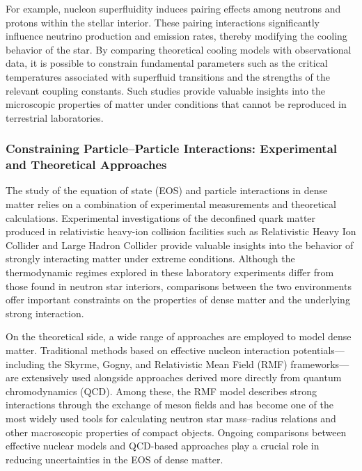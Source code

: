 For example, nucleon superfluidity induces pairing effects among neutrons and protons within the stellar interior. These pairing interactions significantly influence neutrino production and emission rates, thereby modifying the cooling behavior of the star. By comparing theoretical cooling models with observational data, it is possible to constrain fundamental parameters such as the critical temperatures associated with superfluid transitions and the strengths of the relevant coupling constants. Such studies provide valuable insights into the microscopic properties of matter under conditions that cannot be reproduced in terrestrial laboratories.

\subsubsection{Constraining Particle--Particle Interactions: Experimental and Theoretical Approaches}

The study of the equation of state (EOS) and particle interactions in dense matter relies on a combination of experimental measurements and theoretical calculations. Experimental investigations of the deconfined quark matter produced in relativistic heavy-ion collision facilities such as Relativistic Heavy Ion Collider and Large Hadron Collider provide valuable insights into the behavior of strongly interacting matter under extreme conditions. Although the thermodynamic regimes explored in these laboratory experiments differ from those found in neutron star interiors, comparisons between the two environments offer important constraints on the properties of dense matter and the underlying strong interaction.

On the theoretical side, a wide range of approaches are employed to model dense matter. Traditional methods based on effective nucleon interaction potentials---including the Skyrme, Gogny, and Relativistic Mean Field (RMF) frameworks---are extensively used alongside approaches derived more directly from quantum chromodynamics (QCD). Among these, the RMF model describes strong interactions through the exchange of meson fields and has become one of the most widely used tools for calculating neutron star mass--radius relations and other macroscopic properties of compact objects. Ongoing comparisons between effective nuclear models and QCD-based approaches play a crucial role in reducing uncertainties in the EOS of dense matter.

